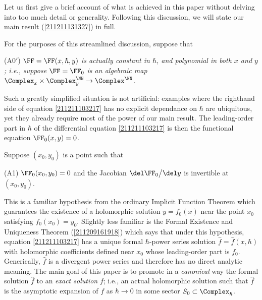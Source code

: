 \documentclass[11pt]{article}
\begin{document}
\HRule





Let us first give a brief account of what is achieved in this paper without delving into too much detail or generality.
Following this discussion, we will state our main result (\autoref{211211131327}) in full.

For the purposes of this streamlined discussion, suppose that
\begin{itemise}
\item [(A0${}'$)] \textit{$\FF = \FF (x, \hbar, y)$ is actually constant in $\hbar$, and polynomial in both $x$ and $y$; i.e., suppose $\FF = \FF_0$ is an algebraic map $\Complex_x \times \Complex^\NN_y \to \Complex^\NN$.}
\end{itemise}
Such a greatly simplified situation is not artificial: examples where the righthand side of equation \eqref{211211103217} has no explicit dependance on $\hbar$ are ubiquitous, yet they already require most of the power of our main result.
The leading-order part in $\hbar$ of the differential equation \eqref{211211103217} is then the functional equation $\FF_0 (x, y) = 0$.

Suppose $(x_0, y_0)$ is a point such that
\begin{itemise}
\item [(A1)] $\FF_0 (x_0, y_0) = 0$ and the Jacobian $\del \FF_0 \big/ \del y$ is invertible at $(x_0, y_0)$.
\end{itemise}
This is a familiar hypothesis from the ordinary Implicit Function Theorem which guarantees the existence of a holomorphic solution $y = f_0 (x)$ near the point $x_0$ satisfying $f_0 (x_0) = y_0$.
Slightly less familiar is the Formal Existence and Uniqueness Theorem (\autoref{211209161918}) which says that under this hypothesis, equation \eqref{211211103217} has a unique formal $\hbar$-power series solution $\hat{f} = \hat{f} (x, \hbar)$ with holomorphic coefficients defined near $x_0$ whose leading-order part is $f_0$.
Generically, $\hat{f}$ is a divergent power series and therefore has no direct analytic meaning.
The main goal of this paper is to promote in a \textit{canonical} way the formal solution $\hat{f}$ to an \textit{exact solution} $f$; i.e., an actual holomorphic solution such that $\hat{f}$ is the asymptotic expansion of $f$ as $\hbar \to 0$ in some sector $S_0 \subset \Complex_\hbar$.
\end{document}
